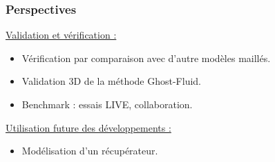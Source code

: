 \documentclass{beamer}
\begin{document}
\begin{frame}
\setlength{\columnseprule}{0.5pt}
    \frametitle{Perspectives}
    \scriptsize

    \begin{multicols}{2}
    
	\center {}
        
\columnbreak
			
			\center {}

\end{multicols}
    \center\color{cea_rouge}\underline{Validation et vérification :} \color{cea_texte}\\
\begin{multicols}{2}
        \begin{itemize}
        
        
        \item Vérification par  comparaison avec d'autre modèles maillés.
        \end{itemize}
        
\columnbreak
			
		
        \begin{itemize}
        
        
        \item Validation 3D de la méthode Ghost-Fluid.
			\item Benchmark : essais LIVE, collaboration.
        \end{itemize}
		
\end{multicols}
\center\color{cea_rouge}\underline{Utilisation future des développements :} \color{cea_texte}
\begin{multicols}{2}
        \begin{itemize}
        
        
        \item Modélisation d'un récupérateur.
        \end{itemize}
        
\columnbreak
			
		
        \begin{itemize}
        

\end{itemize}
\end{multicols}
\end{frame}
\end{document}
